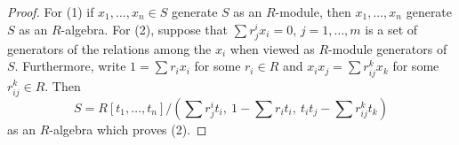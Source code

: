 \documentclass[10pt,a4paper]{amsart}
\theoremstyle{plain}
\theoremstyle{definition}
\theoremstyle{remark}
\numberwithin{equation}{subsection}
\begin{document}
\begin{proof}
For (1) if $x_1, \ldots, x_n \in S$ generate $S$ as an $R$-module,
then $x_1, \ldots, x_n$ generate $S$ as an $R$-algebra. For (2),
suppose that $\sum r_j^ix_i = 0$, $j = 1, \ldots, m$ is a set
of generators of the relations among the $x_i$ when viewed as
$R$-module generators of $S$. Furthermore, write
$1 = \sum r_ix_i$ for some $r_i \in R$ and
$x_ix_j = \sum r_{ij}^k x_k$ for some $r_{ij}^k \in R$.
Then
$$
S = R[t_1, \ldots, t_n]/
(\sum r_j^it_i,\ 1 - \sum r_it_i,\ t_it_j - \sum r_{ij}^k t_k)
$$
as an $R$-algebra which proves (2).
\end{proof}
\end{document}
